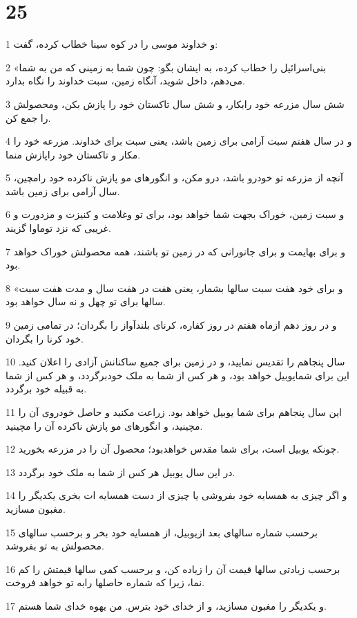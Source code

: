 \chapter{25}

\par 1 و خداوند موسی را در کوه سینا خطاب کرده، گفت:
\par 2 «بنی‌اسرائیل را خطاب کرده، به ایشان بگو: چون شما به زمینی که من به شما می‌دهم، داخل شوید، آنگاه زمین، سبت خداوند را نگاه بدارد.
\par 3 شش سال مزرعه خود رابکار، و شش سال تاکستان خود را پازش بکن، ومحصولش را جمع کن.
\par 4 و در سال هفتم سبت آرامی برای زمین باشد، یعنی سبت برای خداوند. مزرعه خود را مکار و تاکستان خود راپازش منما.
\par 5 آنچه از مزرعه تو خودرو باشد، درو مکن، و انگورهای مو پازش ناکرده خود رامچین، سال آرامی برای زمین باشد.
\par 6 و سبت زمین، خوراک بجهت شما خواهد بود، برای تو وغلامت و کنیزت و مزدورت و غریبی که نزد توماوا گزیند.
\par 7 و برای بهایمت و برای جانورانی که در زمین تو باشند، همه محصولش خوراک خواهد بود.
\par 8 «و برای خود هفت سبت سالها بشمار، یعنی هفت در هفت سال و مدت هفت سبت سالها برای تو چهل و نه سال خواهد بود.
\par 9 و در روز دهم ازماه هفتم در روز کفاره، کرنای بلندآواز را بگردان؛ در تمامی زمین خود کرنا را بگردان.
\par 10 سال پنجاهم را تقدیس نمایید، و در زمین برای جمیع ساکنانش آزادی را اعلان کنید. این برای شمایوبیل خواهد بود، و هر کس از شما به ملک خودبرگردد، و هر کس از شما به قبیله خود برگردد.
\par 11 این سال پنجاهم برای شما یوبیل خواهد بود. زراعت مکنید و حاصل خودروی آن را مچینید، و انگورهای مو پازش ناکرده آن را مچینید.
\par 12 چونکه یوبیل است، برای شما مقدس خواهدبود؛ محصول آن را در مزرعه بخورید.
\par 13 در این سال یوبیل هر کس از شما به ملک خود برگردد.
\par 14 و اگر چیزی به همسایه خود بفروشی یا چیزی از دست همسایه ات بخری یکدیگر را مغبون مسازید.
\par 15 برحسب شماره سالهای بعد ازیوبیل، از همسایه خود بخر و برحسب سالهای محصولش به تو بفروشد.
\par 16 برحسب زیادتی سالها قیمت آن را زیاده کن، و برحسب کمی سالها قیمتش را کم نما، زیرا که شماره حاصلها رابه تو خواهد فروخت.
\par 17 و یکدیگر را مغبون مسازید، و از خدای خود بترس. من یهوه خدای شما هستم.
